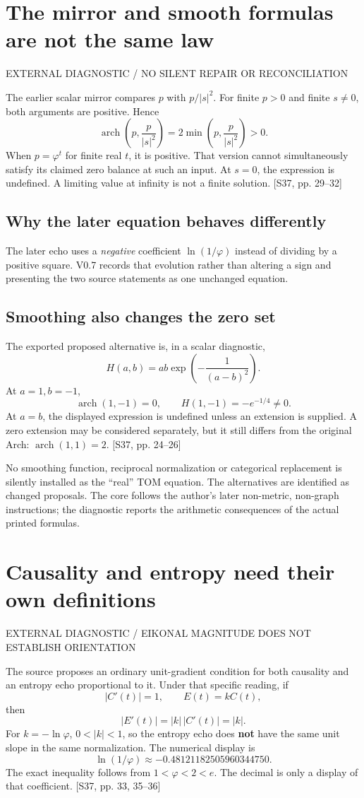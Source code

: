 \documentclass[11pt,a4paper]{article}
\newcommand{\newsec}[2]{\clearpage\section{#1}{\sffamily\footnotesize\color{teal}\MakeUppercase{#2}\par}\vspace{5pt}}
\newcommand{\src}[1]{{\small\color{muted}[S37, #1]}}
\newcommand{\ar}{\operatorname{arch}}
\begin{document}
\newsec{The mirror and smooth formulas are not the same law}{External diagnostic / no silent repair or reconciliation}
The earlier scalar mirror compares $p$ with $p/|s|^2$. For finite $p>0$ and finite $s\ne0$, both arguments are positive. Hence
\[
 \ar\left(p,\frac{p}{|s|^2}\right)
 =2\min\left(p,\frac{p}{|s|^2}\right)>0.
\]
When $p=\varphi^t$ for finite real $t$, it is positive. That version cannot simultaneously satisfy its claimed zero balance at such an input. At $s=0$, the expression is undefined. A limiting value at infinity is not a finite solution. \src{pp. 29--32}

\subsection{Why the later equation behaves differently}
The later echo uses a \emph{negative} coefficient $\ln(1/\varphi)$ instead of dividing by a positive square. V0.7 records that evolution rather than altering a sign and presenting the two source statements as one unchanged equation.

\subsection{Smoothing also changes the zero set}
The exported proposed alternative is, in a scalar diagnostic,
\[
 H(a,b)=ab\exp\!\left(-\frac{1}{(a-b)^2}\right).
\]
At $a=1,b=-1$,
\[
 \ar(1,-1)=0,\qquad H(1,-1)=-e^{-1/4}\ne0.
\]
At $a=b$, the displayed expression is undefined unless an extension is supplied. A zero extension may be considered separately, but it still differs from the original Arch: $\ar(1,1)=2$. \src{pp. 24--26}

\begin{boxx}
No smoothing function, reciprocal normalization or categorical replacement is silently installed as the ``real'' TOM equation. The alternatives are identified as changed proposals. The core follows the author's later non-metric, non-graph instructions; the diagnostic reports the arithmetic consequences of the actual printed formulas.
\end{boxx}

\newsec{Causality and entropy need their own definitions}{External diagnostic / Eikonal magnitude does not establish orientation}
The source proposes an ordinary unit-gradient condition for both causality and an entropy echo proportional to it. Under that specific reading, if
\[
 |C'(t)|=1,\qquad E(t)=kC(t),
\]
then
\[
 |E'(t)|=|k|\,|C'(t)|=|k|.
\]
For $k=-\ln\varphi$, $0<|k|<1$, so the entropy echo does \textbf{not} have the same unit slope in the same normalization. The numerical display is
\[
 \ln(1/\varphi)\approx-0.48121182505960344750.
\]
The exact inequality follows from $1<\varphi<2<e$. The decimal is only a display of that coefficient. \src{pp. 33, 35--36}
\end{document}

